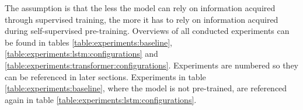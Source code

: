 The assumption is that the less the model can rely on information acquired through supervised training, the more it has to rely on information acquired during self-supervised pre-training. Overviews of all conducted experiments can be found in tables \ref{table:experiments:baseline}, \ref{table:experiments:lstm:configurations} and \ref{table:experiments:transformer:configurations}.
Experiments are numbered so they can be referenced in later sections. Experiments in table \ref{table:experiments:baseline}, where the model is not pre-trained, are referenced again in table \ref{table:experiments:lstm:configurations}.

\begin{table}[]
\end{table}
